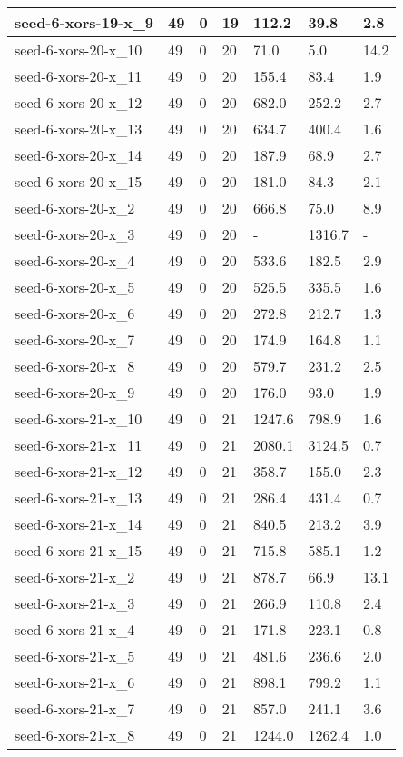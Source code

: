 \begin{scriptsize}
\begin{longtable}{|p{5cm}|l|l|l|l|l|l|}
seed-6-xors-19-x\_9&49&0&19&112.2&39.8&2.8 \\ \hline 
seed-6-xors-20-x\_10&49&0&20&71.0&5.0&14.2 \\ \hline 
seed-6-xors-20-x\_11&49&0&20&155.4&83.4&1.9 \\ \hline 
seed-6-xors-20-x\_12&49&0&20&682.0&252.2&2.7 \\ \hline 
seed-6-xors-20-x\_13&49&0&20&634.7&400.4&1.6 \\ \hline 
seed-6-xors-20-x\_14&49&0&20&187.9&68.9&2.7 \\ \hline 
seed-6-xors-20-x\_15&49&0&20&181.0&84.3&2.1 \\ \hline 
seed-6-xors-20-x\_2&49&0&20&666.8&75.0&8.9 \\ \hline 
seed-6-xors-20-x\_3&49&0&20&-&1316.7&- \\ \hline 
seed-6-xors-20-x\_4&49&0&20&533.6&182.5&2.9 \\ \hline 
seed-6-xors-20-x\_5&49&0&20&525.5&335.5&1.6 \\ \hline 
seed-6-xors-20-x\_6&49&0&20&272.8&212.7&1.3 \\ \hline 
seed-6-xors-20-x\_7&49&0&20&174.9&164.8&1.1 \\ \hline 
seed-6-xors-20-x\_8&49&0&20&579.7&231.2&2.5 \\ \hline 
seed-6-xors-20-x\_9&49&0&20&176.0&93.0&1.9 \\ \hline 
seed-6-xors-21-x\_10&49&0&21&1247.6&798.9&1.6 \\ \hline 
seed-6-xors-21-x\_11&49&0&21&2080.1&3124.5&0.7 \\ \hline 
seed-6-xors-21-x\_12&49&0&21&358.7&155.0&2.3 \\ \hline 
seed-6-xors-21-x\_13&49&0&21&286.4&431.4&0.7 \\ \hline 
seed-6-xors-21-x\_14&49&0&21&840.5&213.2&3.9 \\ \hline 
seed-6-xors-21-x\_15&49&0&21&715.8&585.1&1.2 \\ \hline 
seed-6-xors-21-x\_2&49&0&21&878.7&66.9&13.1 \\ \hline 
seed-6-xors-21-x\_3&49&0&21&266.9&110.8&2.4 \\ \hline 
seed-6-xors-21-x\_4&49&0&21&171.8&223.1&0.8 \\ \hline 
seed-6-xors-21-x\_5&49&0&21&481.6&236.6&2.0 \\ \hline 
seed-6-xors-21-x\_6&49&0&21&898.1&799.2&1.1 \\ \hline 
seed-6-xors-21-x\_7&49&0&21&857.0&241.1&3.6 \\ \hline 
seed-6-xors-21-x\_8&49&0&21&1244.0&1262.4&1.0 \\ \hline 

\end{longtable}
\end{scriptsize}
